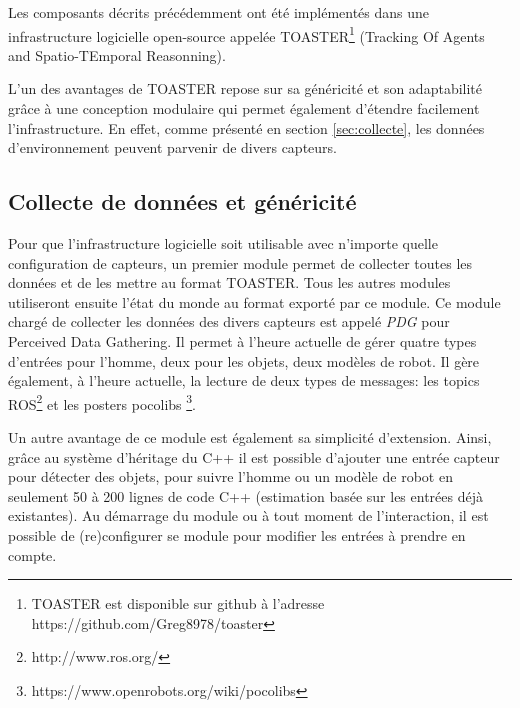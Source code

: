 \documentclass[a4paper,11pt,twoside]{StyleThese}
\begin{document}
Les composants décrits précédemment ont été implémentés dans une infrastructure logicielle open-source appelée TOASTER\footnote{TOASTER est disponible sur github à l'adresse https://github.com/Greg8978/toaster} (Tracking Of Agents and Spatio-TEmporal Reasonning).

L'un des avantages de TOASTER repose sur sa généricité et son adaptabilité grâce à une conception modulaire qui permet également d'étendre facilement l'infrastructure. En effet, comme présenté en section \ref{sec:collecte}, les données d'environnement peuvent parvenir de divers capteurs.

\subsection{Collecte de données et généricité}
\label{sec:PDG}
Pour que l'infrastructure logicielle soit utilisable avec n'importe quelle configuration de capteurs, un premier module permet de collecter toutes les données et de les mettre au format TOASTER. Tous les autres modules utiliseront ensuite l'état du monde au format exporté par ce module. Ce module chargé de collecter les données des divers capteurs est appelé \textit{PDG} pour Perceived Data Gathering.
Il permet à l'heure actuelle de gérer quatre types d'entrées pour l'homme, deux pour les objets, deux modèles de robot. Il gère également, à l'heure actuelle, la lecture de deux types de messages: les topics ROS\footnote{http://www.ros.org/} et les posters pocolibs \footnote{https://www.openrobots.org/wiki/pocolibs}.

Un autre avantage de ce module est également sa simplicité d'extension. Ainsi, grâce au système d'héritage du C++ il est possible d'ajouter une entrée capteur pour détecter des objets, pour suivre l'homme ou un modèle de robot en seulement 50 à 200 lignes de code C++ (estimation basée sur les entrées déjà existantes).
Au démarrage du module ou à tout moment de l'interaction, il est possible de (re)configurer se module pour modifier les entrées à prendre en compte.
\end{document}
